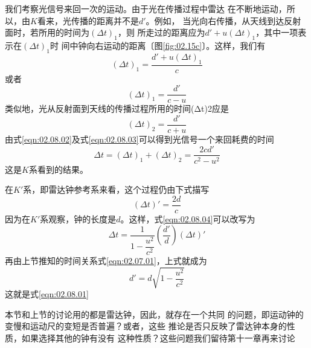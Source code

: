 我们考察光信号来回一次的运动。由于光在传播过程中雷达
在不断地运动，所以，由$K$看来，光传播的距离并不是$d'$。例如，
当光向右传播，从天线到达反射面时，若所用的时间为$(\Delta t)_1$，则
所走过的距离应为$ d ' + u ( \Delta t ) _ { 1 }$，其中一项表示在$(\Delta t)_1$时
间中钟向右运动的距离〔图\ref{fig:02.15c}〕。这样，我们有
\begin{equation*}
    ( \Delta t ) _ { 1 } = \frac { d ' + u (\Delta t)_1 } { c }
\end{equation*}
或者
\begin{equation}\label{eqn:02.08.02}
    ( \Delta t ) _ { 1 } = \frac { d ' } { c - u }
\end{equation}
类似地，光从反射面到天线的传播过程所用的时间(Δt)2应是
\begin{equation}\label{eqn:02.08.03}
    ( \Delta t ) _ { 2 } = \frac { d ' } { c + u }
\end{equation}
由式\eqref{eqn:02.08.02}及式\eqref{eqn:02.08.03}可以得到光信号一个来回耗费的时间
\begin{equation}\label{eqn:02.08.04}
    \Delta t = ( \Delta t ) _ { 1 } + ( \Delta t ) _ { 2 } =  \frac { 2 c d ' } { c ^ { 2 } - u ^ { 2 } }
\end{equation}
这是$K$系看到的结果。

在$K'$系，即雷达钟参考系来看，这个过程仍由下式描写
\begin{equation*}
    ( \Delta t ) ' = \frac { 2 d } { c }
\end{equation*}
因为在$K'$系观察，钟的长度是$d$。这样，式\eqref{eqn:02.08.04}可以改写为
\begin{equation*}
    \Delta t = \frac { 1 } { 1 - \dfrac { u ^ { 2 } } { c ^ { 2 } } } \left ( \frac { d ' } { d } \right) \left( \Delta t \right) '
\end{equation*}
再由上节推知的时间关系式\eqref{eqn:02.07.01}，上式就成为
\begin{equation*}
    d ' = d \sqrt { 1 - \frac { u ^ { 2 } } { c ^ { 2 } } }
\end{equation*}
\clearpage
\noindent 这就是式\eqref{eqn:02.08.01}

本节和上节的讨论用的都是雷达钟，因此，就存在一个共同
的问题，即运动钟的变慢和运动尺的变短是否普遍？或者，这些
推论是否只反映了雷达钟本身的性质，如果选择其他的钟有没有
这种性质？这些问题我们留待第十一章再来讨论
